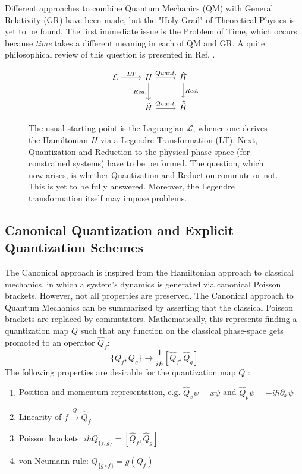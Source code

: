 \documentclass[a4paper,10pt]{article}
\numberwithin{equation}{section}
\begin{document}
Different approaches to combine Quantum Mechanics (QM) with General Relativity (GR) have been made, but the "Holy Grail" of Theoretical Physics is yet to be found. The first immediate issue is the Problem of Time, which occurs because \textit{time} takes a different meaning in each of QM and GR. A quite philosophical review of this question is presented in Ref. \cite{AndersonTimeQG}.


\begin{figure}[H]
    \centering
    
\[ \begin{tikzcd}
\mathcal{L} \arrow{r}{LT} & H \arrow{r}{Quant.} \arrow[swap]{d}{Red.} & \hat{H} \arrow{d}{Red.} \\%
& \tilde{H} \arrow{r}{Quant.}&  \tilde{\hat{H}}
\end{tikzcd}
\]
    \caption{The usual starting point is the Lagrangian $\mathcal{L}$, whence one derives the Hamiltonian $H$ via a Legendre Transformation (LT). Next, Quantization and Reduction to the physical phase-space (for constrained systems) have to be performed. The question, which now arises, is whether Quantization and Reduction commute or not. This is yet to be fully answered. Moreover, the Legendre transformation itself may impose problems.}
    \label{quantizationscheme}
\end{figure}



\subsection{Canonical Quantization and Explicit Quantization Schemes}
The Canonical approach is inspired from the Hamiltonian approach to classical mechanics, in which a system's dynamics is generated via canonical Poisson brackets. However, not all properties are preserved. The Canonical approach to Quantum Mechanics can be summarized by asserting that the classical Poisson brackets are replaced by commutators. Mathematically, this represents finding a quantization map $Q$ such that any function on the classical phase-space gets promoted to an operator $\hat{Q}_f$:
\begin{equation}
    \{Q_f,Q_g\} \rightarrow \frac{1}{i\hbar} [ \hat{Q}_f, \hat{Q}_g ]
\end{equation}
The following properties are desirable \cite{Qproperties} for the quantization map $Q$ :
\begin{enumerate}
    \item Position and momentum representation, e.g. $\hat{Q}_x \psi = x \psi$ and   $\hat{Q}_p \psi = - i \hbar \partial_x \psi$
    
    \item Linearity of $f \stackrel{Q}{\rightarrow} \hat{Q}_f$
    
    \item Poisson brackets: $i\hbar Q_{\{f,g\}} = [ \hat{Q}_f, \hat{Q}_g ]$
    
    \item von Neumann rule: $Q_{\{g \circ f\}} = g(Q_f)$
\end{enumerate}
\end{document}
